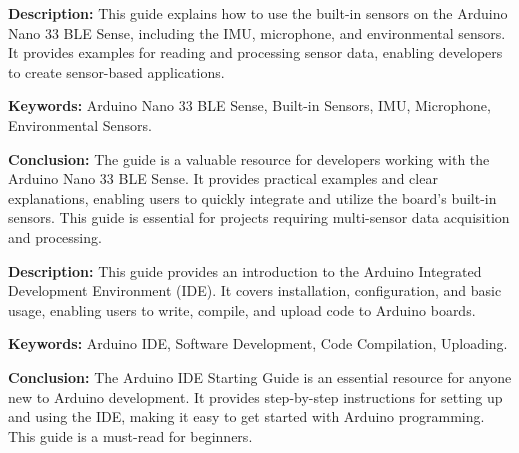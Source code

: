 {
	\textbf{Description:} This guide explains how to use the built-in sensors on the Arduino Nano 33 BLE Sense, including the IMU, microphone, and environmental sensors. It provides examples for reading and processing sensor data, enabling developers to create sensor-based applications.
	\newline
	
	\textbf{Keywords:} Arduino Nano 33 BLE Sense, Built-in Sensors, IMU, Microphone, Environmental Sensors.
	
	\newpage
	\textbf{Conclusion:} The guide is a valuable resource for developers working with the Arduino Nano 33 BLE Sense. It provides practical examples and clear explanations, enabling users to quickly integrate and utilize the board's built-in sensors. This guide is essential for projects requiring multi-sensor data acquisition and processing\cite{Arduino:2024d}.
}

{
	\textbf{Description:} This guide provides an introduction to the Arduino Integrated Development Environment (IDE). It covers installation, configuration, and basic usage, enabling users to write, compile, and upload code to Arduino boards.
	\newline
	
	\textbf{Keywords:} Arduino IDE, Software Development, Code Compilation, Uploading.
	
	\newpage
	\textbf{Conclusion:} The Arduino IDE Starting Guide is an essential resource for anyone new to Arduino development. It provides step-by-step instructions for setting up and using the IDE, making it easy to get started with Arduino programming. This guide is a must-read for beginners\cite{Arduino:2024e}.
}

